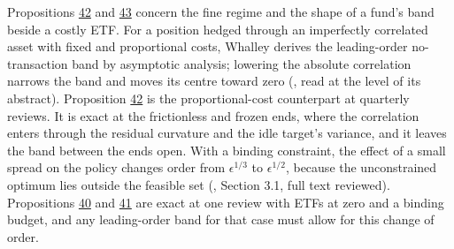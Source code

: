 \documentclass[11pt]{article}
\begin{document}
Propositions \hyperref[res:Proposition-42]{42} and \hyperref[res:Proposition-43]{43} concern the fine regime and the shape of a
fund's band beside a costly ETF. For a position hedged through an
imperfectly correlated asset with fixed and proportional costs,
Whalley derives the leading-order no-transaction band by asymptotic
analysis; lowering the absolute correlation narrows the band and moves
its centre toward zero (\cite{whalley2011optimal}, read at the level of its
abstract). Proposition \hyperref[res:Proposition-42]{42} is the proportional-cost counterpart at
quarterly reviews. It is exact at the frictionless and frozen ends,
where the correlation enters through the residual curvature and the
idle target's variance, and it leaves the band between the ends open.
With a binding constraint, the effect of a small spread on the policy
changes order from \(\epsilon^{1/3}\) to \(\epsilon^{1/2}\), because the unconstrained optimum
lies outside the feasible set (\cite{liu2013portfolio}, Section 3.1, full
text reviewed). Propositions \hyperref[res:Proposition-40]{40} and \hyperref[res:Proposition-41]{41} are exact at one review with
ETFs at zero and a binding budget, and any leading-order band for that
case must allow for this change of order.
\end{document}
